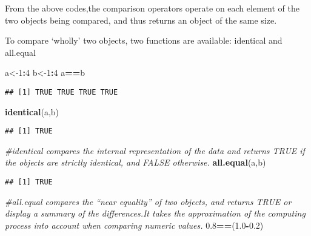 \documentclass[]{book}
\newenvironment{Shaded}{\begin{snugshade}}{\end{snugshade}}
\newcommand{\KeywordTok}[1]{\textcolor[rgb]{0.13,0.29,0.53}{\textbf{#1}}}
\newcommand{\DecValTok}[1]{\textcolor[rgb]{0.00,0.00,0.81}{#1}}
\newcommand{\FloatTok}[1]{\textcolor[rgb]{0.00,0.00,0.81}{#1}}
\newcommand{\CommentTok}[1]{\textcolor[rgb]{0.56,0.35,0.01}{\textit{#1}}}
\newcommand{\OperatorTok}[1]{\textcolor[rgb]{0.81,0.36,0.00}{\textbf{#1}}}
\newcommand{\NormalTok}[1]{#1}
\theoremstyle{definition}
\theoremstyle{definition}
\theoremstyle{definition}
\theoremstyle{remark}
\begin{document}
From the above codes,the comparison operators operate on each element of
the two objects being compared, and thus returns an object of the same
size.

To compare `wholly' two objects, two functions are available: identical
and all.equal

\begin{Shaded}
\begin{Highlighting}[]
\NormalTok{a<-}\DecValTok{1}\OperatorTok{:}\DecValTok{4}
\NormalTok{b<-}\DecValTok{1}\OperatorTok{:}\DecValTok{4}
\NormalTok{a}\OperatorTok{==}\NormalTok{b}
\end{Highlighting}
\end{Shaded}

\begin{verbatim}
## [1] TRUE TRUE TRUE TRUE
\end{verbatim}

\begin{Shaded}
\begin{Highlighting}[]
\KeywordTok{identical}\NormalTok{(a,b)}
\end{Highlighting}
\end{Shaded}

\begin{verbatim}
## [1] TRUE
\end{verbatim}

\begin{Shaded}
\begin{Highlighting}[]
\CommentTok{#identical compares the internal representation of the data and returns TRUE if the objects are strictly identical, and FALSE otherwise.}
\KeywordTok{all.equal}\NormalTok{(a,b)}
\end{Highlighting}
\end{Shaded}

\begin{verbatim}
## [1] TRUE
\end{verbatim}

\begin{Shaded}
\begin{Highlighting}[]
\CommentTok{#all.equal compares the “near equality” of two objects, and returns TRUE or display a summary of the differences.It takes the approximation of the computing process into account when comparing numeric values.}
\FloatTok{0.8}\OperatorTok{==}\NormalTok{(}\FloatTok{1.0}\OperatorTok{-}\FloatTok{0.2}\NormalTok{)}
\end{Highlighting}
\end{Shaded}
\end{document}
